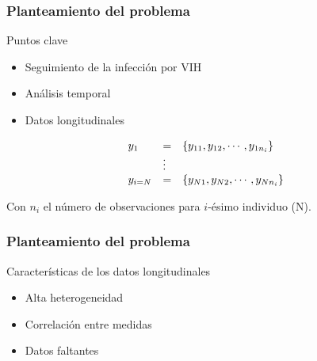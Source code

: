 \documentclass{beamer}%
\begin{document}
\begin{frame}[fragile]
\frametitle{\textbf{Planteamiento del problema}}
\begin{block}{Puntos clave}
\end{block}
\begin{itemize}
\item Seguimiento de la infecci\'on por VIH
\item An\'alisis temporal
\item Datos longitudinales
\end{itemize}
\begin{equation}
\notag
 \begin{array}{lll}
y_{1} & = & \{ y_{11}, y_{12}, \cdots, y_{1n_{i}} \}                 \\
&     \vdots            &     \\
y_{i=N} & = & \{ y_{N1}, y_{N2}, \cdots, y_{Nn_{i}} \}                 \\
\end{array} \label{eq1}
\end{equation}

Con $n_i$ el n\'umero de observaciones para   $i$-\'esimo individuo (N).\\
\end{frame}

\begin{frame}[fragile]
\frametitle{\textbf{Planteamiento del problema}}
\begin{block}{Caracter\'isticas de los datos longitudinales}
\end{block}
\begin{itemize}
   \item Alta heterogeneidad
   \item Correlaci\'on entre medidas 
   \item Datos faltantes
\end{itemize}
\end{frame}
\end{document}
